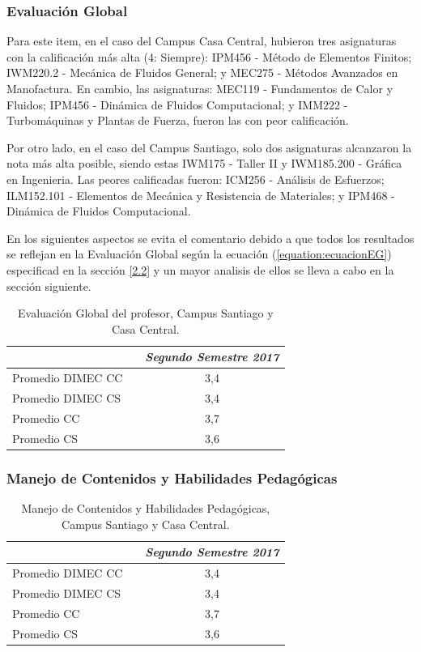 \documentclass[12pt]{article}
\begin{document}
\subsubsection{Evaluación Global}
\begin{text}
Para este item, en el caso del Campus Casa Central, hubieron tres asignaturas con la calificación más alta (4: Siempre): IPM456 - Método de Elementos Finitos; IWM220.2 - Mecánica de Fluidos General; y MEC275 - Métodos Avanzados en Manofactura. En cambio, las asignaturas: MEC119 - Fundamentos de Calor y Fluidos; IPM456 - Dinámica de Fluidos Computacional; y IMM222 - Turbomáquinas y Plantas de Fuerza, fueron las con peor calificación. \par
Por otro lado, en el caso del Campus Santiago, solo dos asignaturas alcanzaron la nota más alta posible, siendo estas IWM175 - Taller II y IWM185.200 - Gráfica en Ingenieria.
Las peores calificadas fueron: ICM256 - Análisis de Esfuerzos; ILM152.101 - Elementos de Mecánica y Resistencia de Materiales; y IPM468 - Dinámica de Fluidos Computacional.\par
En los siguientes aspectos se evita el comentario debido a que todos los resultados se reflejan en la Evaluación Global según la ecuación (\ref{equation:ecuacionEG}) especificad en la sección \ref{2.2} y un mayor analisis de ellos se lleva a cabo en la sección siguiente.
\end{text}
\begin{table}[H]
\centering
\begin{tabular}{llc}
& & \textit{Segundo Semestre 2017} \\ \hline
Promedio DIMEC CC & & 3,4\\
Promedio DIMEC CS & & 3,4\\
Promedio CC & & 3,7 \\
Promedio CS & & 3,6 \\ \hline
\end{tabular}
\caption{Evaluación Global del profesor, Campus Santiago y Casa Central.}
\end{table}
\subsubsection{Manejo de Contenidos y Habilidades Pedagógicas}
\begin{table}[H]
\centering
\begin{tabular}{llc}
& & \textit{Segundo Semestre 2017} \\ \hline
Promedio DIMEC CC & & 3,4\\
Promedio DIMEC CS & & 3,4\\
Promedio CC & & 3,7 \\
Promedio CS & & 3,6 \\ \hline
\end{tabular}
\caption{Manejo de Contenidos y Habilidades Pedagógicas, Campus Santiago y Casa Central.}
\end{table}
\end{document}
